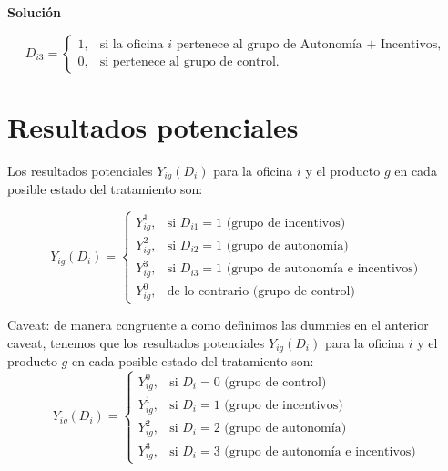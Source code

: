 \documentclass[a4paper, answers, addpoints, 11pt]{exam}
\newenvironment{solucion}{%
  \begin{mdframed}[
    backgroundcolor=blue!5,    %
    linecolor=blue!50,          %
    linewidth=2pt,              %
    leftmargin=10pt,            %
    rightmargin=10pt,           %
    topline=true,              %
    bottomline=true,            %
    roundcorner=10pt,           %
    innerleftmargin=10pt,       %
    innerrightmargin=10pt,      %
    innerbottommargin=10pt,     %
    innertopmargin=10pt         %
  ]%
  \begin{tcolorbox}[colframe=blue!50!black, colback=blue!50, coltitle=white, sharp corners=all, boxrule=1mm, width=\textwidth, halign=left, valign=center, top=0mm, bottom=0mm, left=0mm, right=0mm] \textbf{Solución} \end{tcolorbox} }{\end{mdframed}}
\begin{document}
\begin{enumerate}
\begin{solucion}
\begin{mdframed}[backgroundcolor=moraditoClaro]
\begin{equation*}
D_{i3} =
\begin{cases}
    1, & \text{si la oficina } i \text{ pertenece al grupo de Autonomía + Incentivos}, \\
    0, & \text{si pertenece al grupo de control}.
\end{cases}
\end{equation*}
\end{mdframed}
  \section*{Resultados potenciales} 
Los resultados potenciales $Y_{ig}(D_i)$ para la oficina $i$ y el producto $g$ en cada posible estado del tratamiento son:

\begin{equation*}
    Y_{ig}(D_i) = \begin{cases}
        Y_{ig}^1, & \text{si $D_{i1} = 1$ (grupo de incentivos)} \\
        Y_{ig}^2, & \text{si $D_{i2} = 1$ (grupo de autonomía)} \\
        Y_{ig}^3, & \text{si $D_{i3} = 1$ (grupo de autonomía e incentivos)}\\
         Y_{ig}^0, & \text{de lo contrario (grupo de control)} 
    \end{cases}
\end{equation*}

\begin{mdframed}[backgroundcolor=moraditoClaro]
Caveat:   de manera congruente a como definimos las dummies en el anterior caveat, tenemos que los resultados potenciales $Y_{ig}(D_i)$ para la oficina $i$ y el producto $g$ en cada posible estado del tratamiento son:
\begin{equation*}
 Y_{ig}(D_i) = \begin{cases}
        Y_{ig}^0, & \text{si $D_i = 0$ (grupo de control)} \\
        Y_{ig}^1, & \text{si $D_i = 1$ (grupo de incentivos)} \\
        Y_{ig}^2, & \text{si $D_i = 2$ (grupo de autonomía)} \\
        Y_{ig}^3, & \text{si $D_i = 3$ (grupo de autonomía e incentivos)}
    \end{cases}
\end{equation*}
        \end{mdframed}
         \end{solucion}
   

\end{enumerate}
\end{document}
